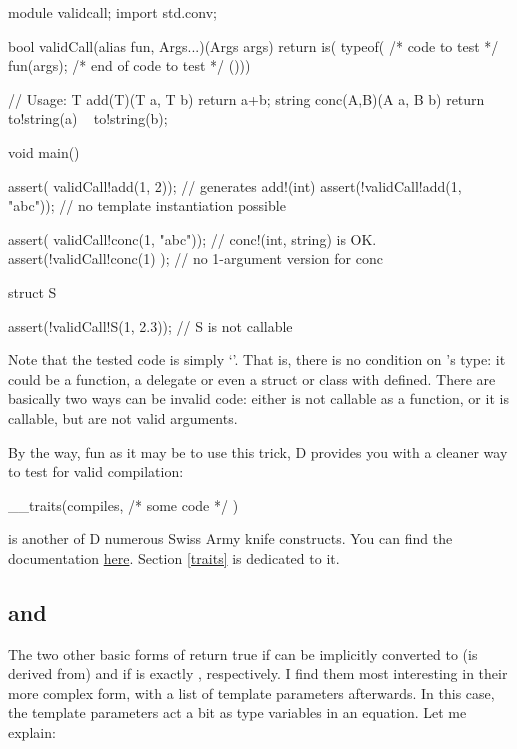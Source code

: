 \begin{dcode}
module validcall;
import std.conv;

bool validCall(alias fun, Args...)(Args args) 
{
    return is( typeof({ /* code to test */
                        fun(args);
                        /* end of code to test */
                      }()))
}

// Usage:
T add(T)(T a, T b) { return a+b;}
string conc(A,B)(A a, B b) { return to!string(a) ~ to!string(b);}

void main()
{
    assert( validCall!add(1, 2));   // generates add!(int)
    assert(!validCall!add(1, "abc")); // no template instantiation possible

    assert( validCall!conc(1, "abc")); // conc!(int, string) is OK.
    assert(!validCall!conc(1)       ); // no 1-argument version for conc

    struct S {}
  
    assert(!validCall!S(1, 2.3)); // S is not callable
}
\end{dcode}

Note that the tested code is simply `'. That is, there is no condition on 's type: it could be a function, a delegate or even a struct or class with  defined. There are basically two ways  can be invalid code: either  is not callable as a function, or it is callable, but  are not valid arguments.

By the way, fun as it may be to use this trick, D provides you with a cleaner way to test for valid compilation:

\begin{dcode}
__traits(compiles, { /* some code */ })
\end{dcode}

 is another of D numerous Swiss Army knife constructs. You can find the  documentation \href{http://www.dlang.org/traits.html#compiles}{here}. Section \ref{traits} is dedicated to it.

\subsection{
\texorpdfstring{ and }
               {is(Type : AnotherType) and is(Type == AnotherType)}}
\label{istypeanothertype}

The two other basic forms of  return true if  can be implicitly converted to (is derived from)  and if  is exactly , respectively.  I find them most interesting in their more complex form, with a list of template parameters afterwards. In this case, the template parameters act a bit as type variables in an equation. Let me explain:


